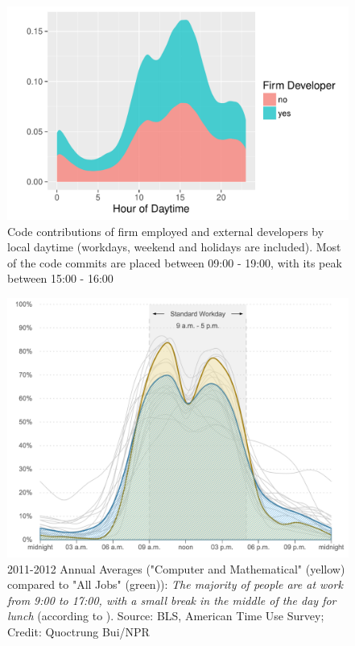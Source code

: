 \begin{figure}[!ht]
	\centering
	\includegraphics[page=1,scale=0.7]{../graphics/intro/hour_of_code_contribution_daytime_local.pdf}
	\caption{Code contributions of firm employed and external developers by local daytime (workdays, weekend and holidays are included). Most of the code commits are placed between 09:00 - 19:00, with its peak between 15:00 - 16:00}
	\label{fig:distribution_developer_commits_local}
\end{figure}

\begin{figure}[!ht]
	\centering
	\includegraphics[scale=0.4]{../graphics/images/us_standard_workday.png}
	\caption{2011-2012 Annual Averages ("Computer and Mathematical" (yellow) compared to "All Jobs" (green)): \textit{The majority of people are at work from 9:00 to 17:00, with a small break in the middle of the day for lunch} (according to \cite{TheAmericanWorkdayInOneGraph:online}). \footnotesize{Source: BLS, American Time Use Survey; Credit: Quoctrung Bui/NPR}}
	\label{fig:us_standard_workday}
\end{figure}

